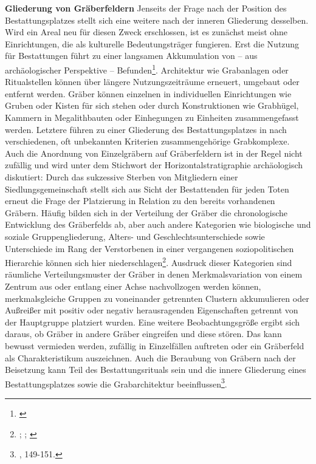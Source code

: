 \documentclass[openany,twoside,twocolumn]{book}
\let\rmarkdownfootnote\footnote%
\def\footnote{\protect\rmarkdownfootnote}
\begin{document}
\textbf{Gliederung von Gräberfeldern} \newline 
Jenseits der Frage nach der Position des Bestattungsplatzes stellt sich eine weitere nach der inneren Gliederung desselben. Wird ein Areal neu für diesen Zweck erschlossen, ist es zunächst meist ohne Einrichtungen, die als kulturelle Bedeutungsträger fungieren. Erst die Nutzung für Bestattungen führt zu einer langsamen Akkumulation von -- aus archäologischer Perspektive -- Befunden\footnote{\textcite{koch_geschichte_1989}}. Architektur wie Grabanlagen oder Ritualstellen können über längere Nutzungszeiträume erneuert, umgebaut oder entfernt werden. Gräber können einzelnen in individuellen Einrichtungen wie Gruben oder Kisten für sich stehen oder durch Konstruktionen wie Grabhügel, Kammern in Megalithbauten oder Einhegungen zu Einheiten zusammengefasst werden. Letztere führen zu einer Gliederung des Bestattungsplatzes in nach verschiedenen, oft unbekannten Kriterien zusammengehörige Grabkomplexe. Auch die Anordnung von Einzelgräbern auf Gräberfeldern ist in der Regel nicht zufällig und wird unter dem Stichwort der Horizontalstratigraphie archäologisch diskutiert: Durch das sukzessive Sterben von Mitgliedern einer Siedlungsgemeinschaft stellt sich aus Sicht der Bestattenden für jeden Toten erneut die Frage der Platzierung in Relation zu den bereits vorhandenen Gräbern. Häufig bilden sich in der Verteilung der Gräber die chronologische Entwicklung des Gräberfelds ab, aber auch andere Kategorien wie biologische und soziale Gruppengliederung, Alters- und Geschlechtsunterschiede sowie Unterschiede im Rang der Verstorbenen in einer vergangenen soziopolitischen Hierarchie können sich hier niederschlagen\footnote{\textcite{derks_geschlechtsspezifische_1993}; \textcite{mchugh_theoretical_1999}; \textcite{veit_tod_1997}}. Ausdruck dieser Kategorien sind räumliche Verteilungsmuster der Gräber in denen Merkmalsvariation von einem Zentrum aus oder entlang einer Achse nachvollzogen werden können, merkmalsgleiche Gruppen zu voneinander getrennten Clustern akkumulieren oder Außreißer mit positiv oder negativ herausragenden Eigenschaften getrennt von der Hauptgruppe platziert wurden. Eine weitere Beobachtungsgröße ergibt sich daraus, ob Gräber in andere Gräber eingreifen und diese stören. Das kann bewusst vermieden werden, zufällig in Einzelfällen auftreten oder ein Gräberfeld als Charakteristikum auszeichnen. Auch die Beraubung von Gräbern nach der Beisetzung kann Teil des Bestattungsrituals sein und die innere Gliederung eines Bestattungsplatzes sowie die Grabarchitektur beeinflussen\footnote{\textcite{hofmann_rituelle_2008}, 149-151.}.
\end{document}
